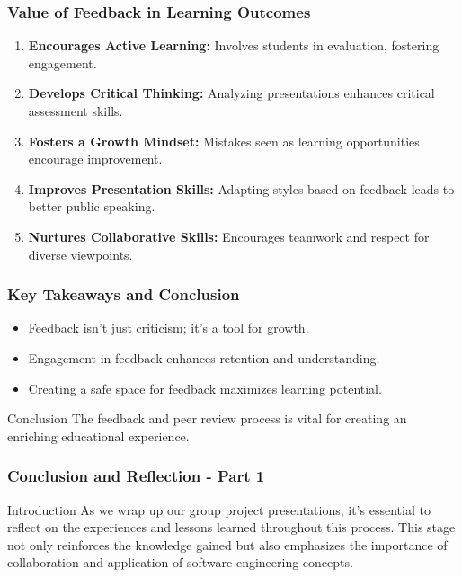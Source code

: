 \documentclass{beamer}
\begin{document}
\begin{frame}[fragile]
    \frametitle{Value of Feedback in Learning Outcomes}
    \begin{enumerate}
        \item \textbf{Encourages Active Learning:} Involves students in evaluation, fostering engagement.
        \item \textbf{Develops Critical Thinking:} Analyzing presentations enhances critical assessment skills.
        \item \textbf{Fosters a Growth Mindset:} Mistakes seen as learning opportunities encourage improvement.
        \item \textbf{Improves Presentation Skills:} Adapting styles based on feedback leads to better public speaking.
        \item \textbf{Nurtures Collaborative Skills:} Encourages teamwork and respect for diverse viewpoints.
    \end{enumerate}
\end{frame}

\begin{frame}[fragile]
    \frametitle{Key Takeaways and Conclusion}
    \begin{itemize}
        \item Feedback isn’t just criticism; it’s a tool for growth.
        \item Engagement in feedback enhances retention and understanding.
        \item Creating a safe space for feedback maximizes learning potential.
    \end{itemize}

    \begin{block}{Conclusion}
        The feedback and peer review process is vital for creating an enriching educational experience.
    \end{block}
\end{frame}

\begin{frame}[fragile]
    \frametitle{Conclusion and Reflection - Part 1}
    \begin{block}{Introduction}
        As we wrap up our group project presentations, it's essential to reflect on the experiences and lessons learned throughout this process. This stage not only reinforces the knowledge gained but also emphasizes the importance of collaboration and application of software engineering concepts.
    \end{block}
\end{frame}
\end{document}
